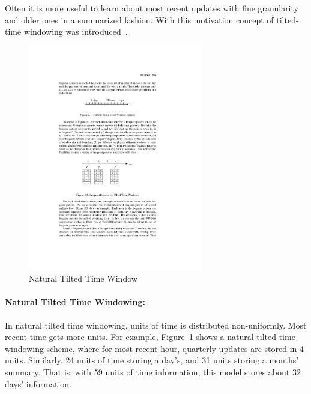 Often it is more useful to learn about most recent updates with fine granularity and older ones in a summarized fashion. With this motivation concept of tilted-time windowing was introduced~\cite{chen02:tiltedtime}.

\begin{figure}[htbp]
    \begin{center}
        \includegraphics[width=3.0in]{figs/naturaltime.pdf}
        \caption{Natural Tilted Time Window}
        \label{fig:bg:ntime}
    \end{center}
\end{figure}
\paragraph{Natural Tilted Time Windowing:} In natural tilted time windowing, units of time is distributed non-uniformly. Most recent time gets more units. For example, Figure~\ref{fig:bg:ntime} shows a natural tilted time windowing scheme, where for most recent hour, quarterly updates are stored in 4 units. Similarly, 24 units of time storing a day's, and 31 units storing a months' summary. That is, with 59 units of time information, this model stores about 32 days' information.

